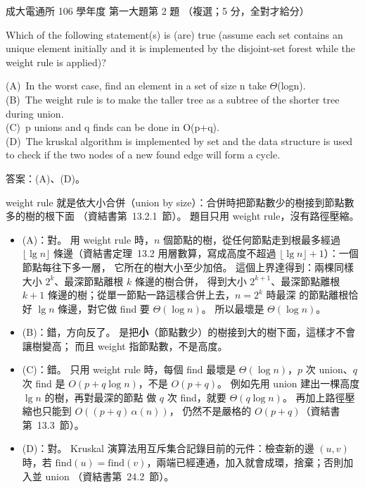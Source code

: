 \begin{pastexam}[label={px:ncku-106-cce-ds-02}]{成大電通所 106 學年度 第一大題第 2 題}
（複選；5 分，全對才給分）

Which of the following statement(s) is (are) true (assume each set contains an unique element
initially and it is implemented by the disjoint-set forest while the weight rule is applied)?

(A)~In the worst case, find an element in a set of size n take $\Theta$(logn).\\
(B)~The weight rule is to make the taller tree as a subtree of the shorter tree during union.\\
(C)~p unions and q finds can be done in O(p+q).\\
(D)~The kruskal algorithm is implemented by set and the data structure is used to check if the two
nodes of a new found edge will form a cycle.
\end{pastexam}

\begin{pastsoln}
答案：(A)、(D)。

weight rule 就是依大小合併（union by size）：合併時把節點數少的樹接到節點數多的樹的根下面
（資結書第~13.2.1~節）。 題目只用 weight rule，沒有路徑壓縮。

\begin{itemize}
\item (A)：對。 用 weight rule 時，$n$ 個節點的樹，從任何節點走到根最多經過 $\lfloor \lg n \rfloor$
條邊（資結書定理~13.2 用層數算，寫成高度不超過 $\lfloor \lg n \rfloor + 1$）：一個節點每往下多一層，
它所在的樹大小至少加倍。 這個上界達得到：兩棵同樣大小 $2^{k}$、最深節點離根 $k$ 條邊的樹合併，
得到大小 $2^{k+1}$、最深節點離根 $k + 1$ 條邊的樹；從單一節點一路這樣合併上去，$n = 2^{k}$ 時最深
的節點離根恰好 $\lg n$ 條邊，對它做 find 要 $\Theta(\log n)$。 所以最壞是 $\Theta(\log n)$。
\item (B)：錯，方向反了。 是把\textbf{小}（節點數少）的樹接到大的樹下面，這樣才不會讓樹變高；
而且 weight 指節點數，不是高度。
\item (C)：錯。 只用 weight rule 時，每個 find 最壞是 $\Theta(\log n)$，$p$ 次 union、$q$ 次 find 是
$O(p + q \log n)$，不是 $O(p + q)$。 例如先用 union 建出一棵高度 $\lg n$ 的樹，再對最深的節點
做 $q$ 次 find，就要 $\Theta(q \log n)$。 再加上路徑壓縮也只能到 $O((p + q)\,\alpha(n))$，
仍然不是嚴格的 $O(p + q)$（資結書第~13.3~節）。
\item (D)：對。 Kruskal 演算法用互斥集合記錄目前的元件：檢查新的邊 $(u, v)$ 時，若
$\text{find}(u) = \text{find}(v)$，兩端已經連通，加入就會成環，捨棄；否則加入並 union
（資結書第~24.2~節）。
\end{itemize}
\end{pastsoln}
